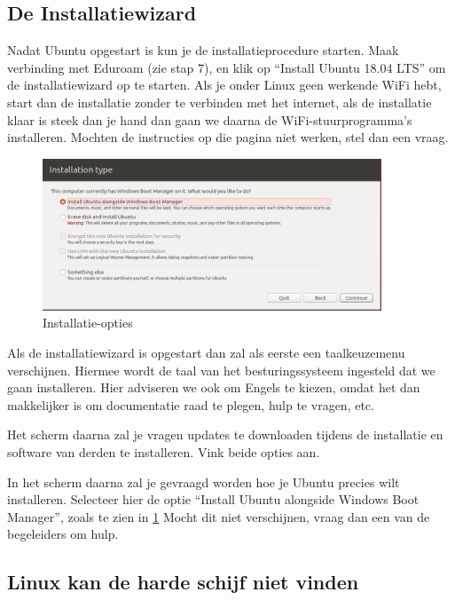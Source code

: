 \documentclass[10pt,a4paper]{article}
\begin{document}
\subsection{De Installatiewizard}
Nadat Ubuntu opgestart is kun je de installatieprocedure starten.
Maak verbinding met Eduroam (zie stap 7), en klik op ``Install Ubuntu 18.04 LTS''
om de installatiewizard op te starten. Als je onder Linux geen werkende WiFi hebt, start
dan de installatie zonder te verbinden met het internet, als de installatie klaar is steek dan
je hand dan gaan we daarna de WiFi-stuurprogramma's installeren.
Mochten de instructies op die pagina niet werken, stel dan een vraag.


\begin{figure}[t]
\includegraphics[width=0.9\textwidth]{install_type}
\caption{Installatie-opties}
\label{img:install}
\end{figure}

Als de installatiewizard is opgestart dan zal als eerste een taalkeuzemenu verschijnen.
Hiermee wordt de taal van het besturingssysteem ingesteld dat we gaan installeren.
Hier adviseren we ook om Engels te kiezen, omdat het dan
makkelijker is om documentatie raad te plegen, hulp te vragen, etc.

Het scherm daarna zal je vragen updates te downloaden tijdens de
installatie en software van derden te installeren. Vink beide opties aan.

In het scherm daarna zal je gevraagd worden hoe je Ubuntu precies wilt installeren.
Selecteer hier de optie ``Install Ubuntu alongside Windows Boot Manager'', zoals te zien in \ref{img:install}
Mocht dit niet verschijnen, vraag dan een van de begeleiders om hulp. %

\subsection{Linux kan de harde schijf niet vinden}
\end{document}
